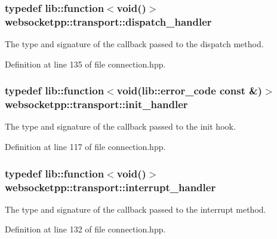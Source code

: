 \subsubsection[{dispatch\+\_\+handler}]{\setlength{\rightskip}{0pt plus 5cm}typedef lib\+::function$<$void()$>$ {\bf websocketpp\+::transport\+::dispatch\+\_\+handler}}\label{namespacewebsocketpp_1_1transport_a6658447b2e10f4c712dd792aad0e0c78}


The type and signature of the callback passed to the dispatch method. 



Definition at line 135 of file connection.\+hpp.

\hypertarget{namespacewebsocketpp_1_1transport_aeae75e675c1a334b3b33ab7120b480a5}{}
\subsubsection[{init\+\_\+handler}]{\setlength{\rightskip}{0pt plus 5cm}typedef lib\+::function$<$void(lib\+::error\+\_\+code const \&)$>$ {\bf websocketpp\+::transport\+::init\+\_\+handler}}\label{namespacewebsocketpp_1_1transport_aeae75e675c1a334b3b33ab7120b480a5}


The type and signature of the callback passed to the init hook. 



Definition at line 117 of file connection.\+hpp.

\hypertarget{namespacewebsocketpp_1_1transport_a8090563b066d7e8e31f7165be18dee51}{}
\subsubsection[{interrupt\+\_\+handler}]{\setlength{\rightskip}{0pt plus 5cm}typedef lib\+::function$<$void()$>$ {\bf websocketpp\+::transport\+::interrupt\+\_\+handler}}\label{namespacewebsocketpp_1_1transport_a8090563b066d7e8e31f7165be18dee51}


The type and signature of the callback passed to the interrupt method. 



Definition at line 132 of file connection.\+hpp.

